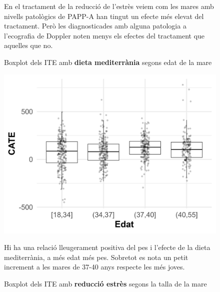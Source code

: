 \documentclass[../main.tex]{subfiles}
\begin{document}
\begin{figure}[!htb]
\begin{minipage}[t]{0.48\textwidth}
        \captionsetup{font=footnotesize}
        \caption{En el tractament de la reducció de l'estrès veiem com les mares amb nivells patològics de PAPP-A han tingut un efecte més elevat del tractament. Però les diagnosticades amb alguna patologia a l'ecografia de Doppler noten menys els efectes del tractament que aquelles que no.}
        \label{boxplot:pes3}
      \end{minipage}
    \end{figure}

    \begin{figure}[!htb]
      \centering
      \begin{minipage}[t]{0.48\textwidth}
        \captionsetup{font=small}
        \caption*{\centering Boxplot dels ITE amb \textbf{dieta mediterrània} segons edat de la mare}
        \includegraphics[width=\textwidth]{imgs/boxplots/boxplot_edad_2_pes.jpg}
        \captionsetup{font=footnotesize}
        \caption{Hi ha una relació lleugerament positiva del pes i l'efecte de la dieta mediterrània, a més edat més pes. Sobretot es nota un petit increment a les mares de 37-40 anys respecte les més joves.}
        \label{boxplot:edat_pes2}
      \end{minipage}
      \hspace{0.01\textwidth}
      \begin{minipage}[t]{0.48\textwidth}
        \captionsetup{font=small}
        \caption*{\centering Boxplot dels ITE amb \textbf{reducció estrès} segons la talla de la mare}

\end{minipage}
\end{figure}
\end{document}
